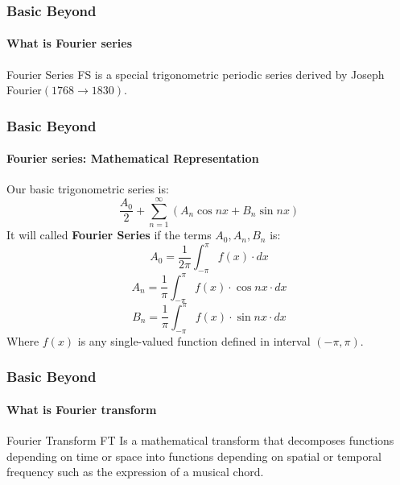 \documentclass[9 pt]{beamer}
\begin{document}
\begin{frame}
	\frametitle{Basic Beyond}
	\framesubtitle{What is Fourier series}
	\begin{block}{Fourier Series}
		FS is a special trigonometric periodic series derived by Joseph Fourier$(1768 \rightarrow 1830)$.
	\end{block}
\end{frame}


\begin{frame}
	\frametitle{Basic Beyond}
	\framesubtitle{Fourier series: Mathematical Representation}
	Our basic trigonometric series is:
	$$\frac{A_0}{2} + \sum_{n=1}^{\infty} (A_n\cos nx + B_n\sin nx)$$
	It will called \textbf{Fourier Series} if the terms $A_0, A_n, B_n$ is:
	$$A_0 = \frac{1}{2\pi}\int_{-\pi}^{\pi} f(x)\cdot dx$$
	$$A_n = \frac{1}{\pi}\int_{-\pi}^{\pi} f(x)\cdot \cos nx\cdot dx$$
	$$B_n = \frac{1}{\pi}\int_{-\pi}^{\pi} f(x)\cdot \sin nx\cdot dx$$
	Where \textbf{$f(x)$} is any single-valued function defined in interval $(-\pi, \pi)$.
	\transfade[duration=0.6]
\end{frame}


\begin{frame}
	\frametitle{Basic Beyond}
	\framesubtitle{What is Fourier transform}
	\begin{block}{Fourier Transform}
		FT Is a mathematical transform that decomposes functions depending on time or space into functions depending on spatial or temporal frequency such as the expression of a musical chord.
	\end{block}
	\transwipe[duration=0.6]
\end{frame}
\end{document}
